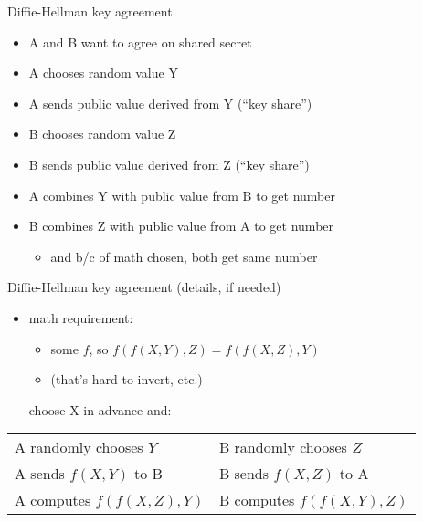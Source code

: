 \begin{frame}{Diffie-Hellman key agreement}
\begin{itemize}
\item A and B want to agree on shared secret
\vspace{.5cm}
\item A chooses random value Y
\item A sends public value derived from Y (``key share'')
\item B chooses random value Z
\item B sends public value derived from Z (``key share'')
\item A combines Y with public value from B to get number
\item B combines Z with public value from A to get number
    \begin{itemize}
    \item and b/c of math chosen, both get same number
    \end{itemize}
\end{itemize}
\end{frame}

\begin{frame}{Diffie-Hellman key agreement (details, if needed)}
    \begin{itemize}
    \item math requirement:
        \begin{itemize}
        \item some $f$, so $f(f(X, Y), Z) = f(f(X, Z), Y)$
        \item (that's hard to invert, etc.)
        \end{itemize}
    choose X in advance and:
    \end{itemize}
\begin{tabular}{l|l}
A randomly chooses $Y$ & B randomly chooses $Z$ \\
A sends $f(X, Y)$ to B & B sends $f(X, Z)$ to A \\
A computes $f(f(X, Z), Y)$ & B computes $f(f(X, Y), Z)$ \\
\end{tabular} \\
\vspace{.5cm}
\end{frame}

